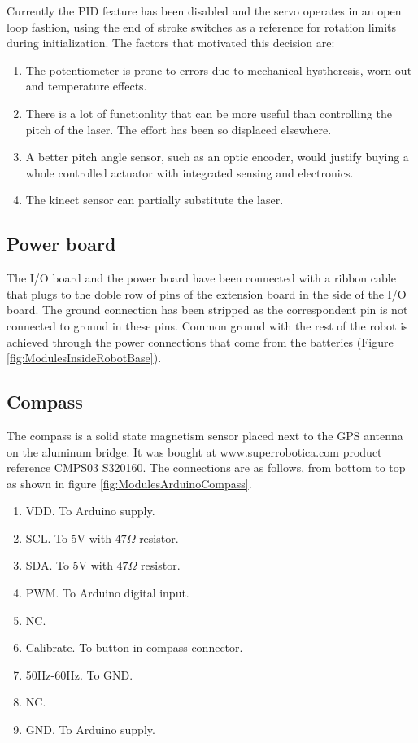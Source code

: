 Currently the PID feature has been disabled and the servo operates in an open loop fashion, using the end of stroke switches as a reference for rotation limits during initialization. The factors that motivated this decision are:
\begin{enumerate}
 \item The potentiometer is prone to errors due to mechanical hystheresis, worn out and temperature effects.
 \item There is a lot of functionlity that can be more useful than controlling the pitch of the laser. The effort has been so displaced elsewhere.
\item A better pitch angle sensor, such as an optic encoder, would justify buying a whole controlled actuator with integrated sensing and electronics.
\item The kinect sensor can partially substitute the laser.
\end{enumerate}


\subsection{Power board}
The I/O board and the power board have been connected with a ribbon cable that plugs to the doble row of pins of the extension board in the side of the I/O board. The ground connection has been stripped as the correspondent pin is not connected to ground in these pins. Common ground with the rest of the robot is achieved through the power connections that come from the batteries (Figure \ref{fig:ModulesInsideRobotBase}).


\subsection{Compass}
The compass is a solid state magnetism sensor placed next to the GPS antenna on
the aluminum bridge.
It was bought at www.superrobotica.com product reference CMPS03 S320160.
The connections are as follows, from bottom to top as shown
in figure \ref{fig:ModulesArduinoCompass}.
\begin{enumerate}
  \item VDD. To Arduino supply.
  \item SCL. To 5V with $47\Omega$ resistor.
  \item SDA. To 5V with $47\Omega$ resistor.
  \item PWM. To Arduino digital input.
  \item NC.
  \item Calibrate. To button in compass connector.
  \item 50Hz-60Hz. To GND.
  \item NC.
  \item GND. To Arduino supply.
\end{enumerate}

